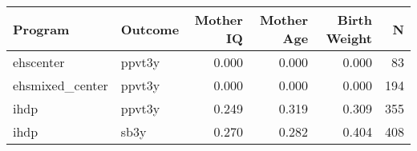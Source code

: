 \begin{table}[ht]
\centering
\begin{tabular}{llrrrr}
  \hline
Program & Outcome & Mother IQ & Mother Age & Birth Weight & N \\ 
  \hline
ehscenter & ppvt3y & 0.000 & 0.000 & 0.000 & 83 \\ 
  ehsmixed\_center & ppvt3y & 0.000 & 0.000 & 0.000 & 194 \\ 
  ihdp & ppvt3y & 0.249 & 0.319 & 0.309 & 355 \\ 
  ihdp & sb3y & 0.270 & 0.282 & 0.404 & 408 \\ 
   \hline
\end{tabular}
\end{table}
